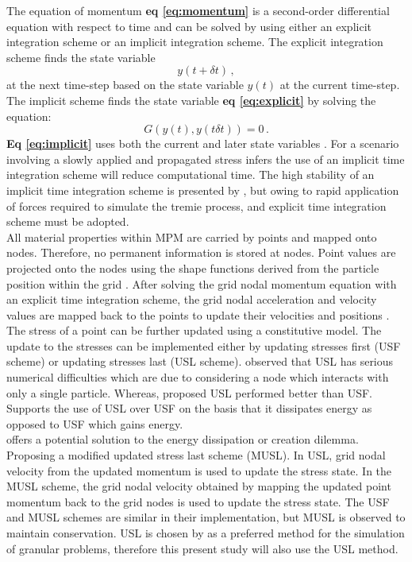 The equation of momentum {\bfseries eq \ref{eq:momentum}} is a second-order differential equation with respect to time and can be solved by using either an explicit integration scheme or an implicit integration scheme. The explicit integration scheme finds the state variable 
\begin{equation}
y(t+\delta t) \,,
\label{eq:explicit}
\end{equation}
at the next time-step based on the state variable $y(t)$ at the current time-step. The implicit scheme finds the state variable {\bfseries eq \ref{eq:explicit}} by solving the equation:
\begin{equation}
G(y(t),y(t\delta t))  = 0\,.
\label{eq:implicit}
\end{equation}
{\bfseries Eq \ref{eq:implicit}} uses both the current and later state variables \citep{zhang16}. For a scenario involving a slowly applied and propagated stress \citep{kafaji13} infers the use of an implicit time integration scheme will reduce computational time. The high stability of an implicit time integration scheme is presented by \cite{love06}, but owing to rapid application of forces required to simulate the tremie process, and explicit time integration scheme must be adopted.\\
\newline
\noindent
All material properties within MPM are carried by points and mapped onto nodes. Therefore, no permanent information is stored at nodes. Point values are projected onto the nodes using the shape functions derived from the particle position within the grid \citep{Krishna}. After solving the grid nodal momentum equation with an explicit time integration scheme, the grid nodal acceleration and velocity values are mapped back to the points to update their velocities and positions \citep{zhang16}. The stress of a point can be further updated using a constitutive model. The update to the stresses can be implemented either by updating stresses first (USF scheme) or updating stresses last (USL scheme). \citet{nairn03} observed that USL has serious numerical difficulties which are due to considering a node which interacts with only a single particle. Whereas, \citet{bardenhagen02} proposed USL performed better than USF. \cite{kafaji13} Supports the use of USL over USF on the basis that it dissipates energy as opposed to USF which gains energy.\\
\newline
\noindent
\citet{nairn03} offers a potential solution to the energy dissipation or creation dilemma. Proposing a modified updated stress last scheme (MUSL). In USL, grid nodal velocity from the updated momentum is used to update the stress state. In the MUSL scheme, the grid nodal velocity obtained by mapping the updated point momentum back to the grid nodes is used to update the stress state. The USF and MUSL schemes are similar in their implementation, but MUSL is observed to maintain conservation. USL is chosen by \citet{Krishna} as a preferred method for the simulation of granular problems, therefore this present study will also use the USL method.
